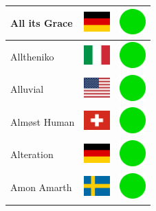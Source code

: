 \documentclass[12pt, a4paper, twoside]{report}
\begin{document}
\begin{center}
\begin{longtable}{|p{5cm}|p{2cm}|p{2cm}|}
 All its Grace                                              & \includegraphics[width=1cm]{../img/flags/de} &   \includegraphics[width=1cm]{../likes/y} \\ \hline
 Alltheniko                                                 & \includegraphics[width=1cm]{../img/flags/it} &   \includegraphics[width=1cm]{../likes/y} \\ \hline
 Alluvial                                                   & \includegraphics[width=1cm]{../img/flags/us} &   \includegraphics[width=1cm]{../likes/y} \\ \hline
 Almøst Human                                               & \includegraphics[width=1cm]{../img/flags/ch} &   \includegraphics[width=1cm]{../likes/y} \\ \hline
 Alteration                                                 & \includegraphics[width=1cm]{../img/flags/de} &   \includegraphics[width=1cm]{../likes/y} \\ \hline
 Amon Amarth                                                & \includegraphics[width=1cm]{../img/flags/se} &   \includegraphics[width=1cm]{../likes/y} \\ \hline

\end{longtable}
\end{center}
\end{document}
